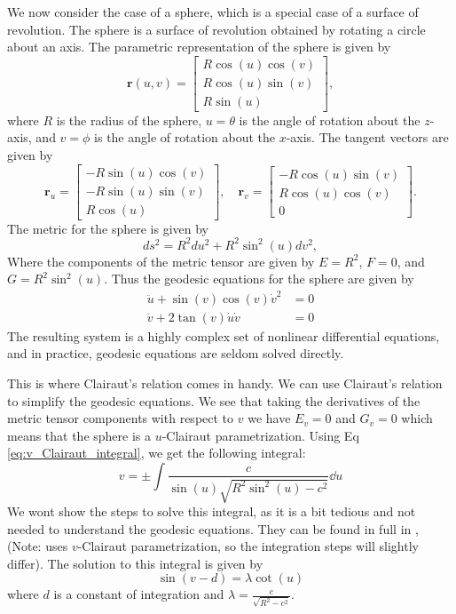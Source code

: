 \documentclass[12pt]{article}
\begin{document}
We now consider the case of a sphere, which is a special case of a surface of revolution.
The sphere is a surface of revolution obtained by rotating a circle about an axis.
The parametric representation of the sphere is given by
\[
    \mathbf{r}(u, v) = \begin{bmatrix} R \cos (u) \cos (v) \\ R \cos (u) \sin (v) \\ R \sin (u) \end{bmatrix},
\]
where \(R\) is the radius of the sphere, \(u = \theta\) is the angle of rotation about the \(z\)-axis, and \(v = \phi\) is the angle of rotation about the \(x\)-axis.
The tangent vectors are given by
\[
    \mathbf{r}_u = \begin{bmatrix} -R \sin (u) \cos (v) \\ -R \sin (u) \sin (v) \\ R \cos (u) \end{bmatrix}, \quad \mathbf{r}_v = \begin{bmatrix} -R \cos (u) \sin (v) \\ R \cos (u) \cos (v) \\ 0 \end{bmatrix}.
\]
The metric for the sphere is given by
\[
    ds^2 = R^2 du^2 + R^2 \sin^2 (u) dv^2,
\]
Where the components of the metric tensor are given by \(E = R^2 \), \(F = 0\), and \(G = R^2 \sin^2 (u)\).
Thus the geodesic equations for the sphere are given by
\begin{align*}
    \ddot{u} + \sin(v) \cos(v) \dot{v}^2 &= 0 \\
    \ddot{v} + 2\tan(v) \dot{u} \dot{v} &= 0 
\end{align*}
The resulting system is a highly complex set of nonlinear differential equations, and in practice, geodesic equations are seldom solved directly.

This is where Clairaut's relation comes in handy.
We can use Clairaut's relation to simplify the geodesic equations.
We see that taking the derivatives of the metric tensor components with respect to \(v\) we have $E_v = 0$ and $G_v = 0$ which means that the sphere is a $u$-Clairaut parametrization.
Using Eq \eqref{eq:v_Clairaut_integral}, we get the following integral:
\[
    v = \pm \int \frac{c}{\sin(u)\sqrt{R^2\sin^{2}(u) - c^{2}}} \dd{u}
\]
We wont show the steps to solve this integral, as it is a bit tedious and not needed to understand the geodesic equations.
They can be found in full in \cite{oprea2007differential}, (Note: \cite{oprea2007differential} uses $v$-Clairaut parametrization, so the integration steps will slightly differ).
The solution to this integral is given by 
\[
\sin(v - d) = \lambda \cot(u)
\]
where \(d\) is a constant of integration and \(\lambda = \frac{c}{\sqrt{R^2 - c^2}}\).
\end{document}
